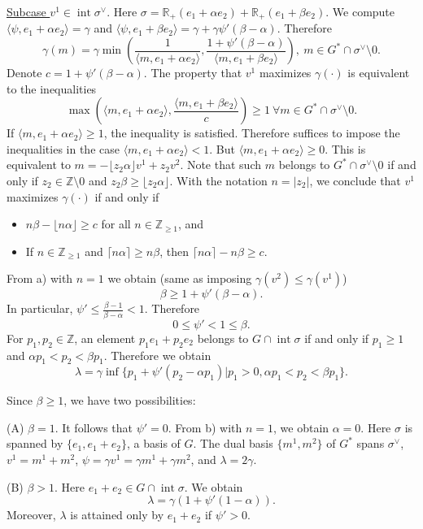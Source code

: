 \documentclass[12pt,reqno]{amsart}
\newcommand{\Z}{{\mathbb Z}}
\newcommand{\R}{{\mathbb R}}
\newcommand{\Int}{\operatorname{int}}
\theoremstyle{plain}
\theoremstyle{definition}
\theoremstyle{remark}
\begin{document}
\underline{Subcase $v^1\in \Int \sigma^\vee$}. 
Here $\sigma=\R_+(e_1+\alpha e_2)+\R_+ (e_1+\beta e_2)$.
We compute $\langle \psi,e_1+\alpha e_2\rangle=\gamma$ and $\langle \psi,e_1+\beta e_2\rangle=\gamma+\gamma\psi'(\beta-\alpha)$.
Therefore
$$
\gamma(m)=\gamma\min(\frac{1}{\langle m,e_1+\alpha e_2\rangle},
\frac{1+\psi'(\beta-\alpha)}{\langle m,e_1+\beta e_2\rangle}), \ m\in G^*\cap \sigma^\vee\setminus 0.
$$
Denote $c=1+\psi'(\beta-\alpha)$.
The property that $v^1$ maximizes $\gamma(\cdot)$ is equivalent to the inequalities
$$
\max(\langle m,e_1+\alpha e_2\rangle,
\frac{\langle m,e_1+\beta e_2\rangle}{c})\ge 1 \ \forall m\in G^*\cap \sigma^\vee\setminus 0.
$$
If $\langle m,e_1+\alpha e_2\rangle\ge 1$, the inequality is satisfied. Therefore suffices to impose the inequalities in the case $\langle m,e_1+\alpha e_2\rangle< 1$.
But $\langle m,e_1+\alpha e_2\rangle\ge 0$. This is equivalent to $m=-\lfloor z_2\alpha\rfloor v^1+z_2v^2$.
Note that such $m$ belongs to $G^*\cap \sigma^\vee\setminus 0$ if and only if $z_2\in \Z\setminus 0$
and $z_2\beta\ge \lfloor z_2\alpha\rfloor$. With the notation $n=|z_2|$,
we conclude that $v^1$ maximizes $\gamma(\cdot)$ if and only if 
\begin{itemize}
	\item[a)] $n\beta-\lfloor n\alpha\rfloor\ge c$ for all $n\in \Z_{\ge 1}$, and 
	\item[b)] If $n\in \Z_{\ge 1}$ and $\lceil n\alpha\rceil\ge n\beta$, then $\lceil n\alpha\rceil- n\beta\ge c$.
\end{itemize}
 
From a) with $n=1$ we obtain (same as imposing $\gamma(v^2)\le \gamma(v^1)$)
$$
\beta\ge 1+\psi'(\beta-\alpha).
$$
In particular, 
$\psi'\le \frac{\beta-1}{\beta-\alpha}<1$. Therefore 
$$
0\le \psi'<1\le \beta.
$$
For $p_1,p_2\in \Z$,
an element $p_1e_1+p_2e_2$ belongs to $G\cap \Int \sigma$ if and only 
if $p_1\ge 1$ and $\alpha p_1<p_2<\beta p_1$. Therefore we obtain
$$
\lambda=\gamma \inf\{p_1+\psi'(p_2-\alpha p_1) \vert p_1>0,\alpha p_1<p_2<\beta p_1\}.
$$

Since $\beta\ge 1$, we have two possibilities:

(A) $\beta=1$. It follows that $\psi'=0$. From b) with $n=1$, we obtain $\alpha=0$. Here $\sigma$ is spanned by $\{e_1,e_1+e_2\}$, a basis of $G$.
The dual basis $\{m^1,m^2\}$ of $G^*$ spans $\sigma^\vee$,  
$v^1=m^1+m^2$, $\psi=\gamma v^1=\gamma m^1+\gamma m^2$, and
$
\lambda=2\gamma.
$

(B) $\beta>1$. Here $e_1+e_2\in G\cap \Int \sigma$. We obtain
$$
\lambda=\gamma(1+\psi'(1-\alpha)).
$$ 
Moreover, $\lambda$ is attained only by $e_1+e_2$ if $\psi'>0$.
\end{document}
